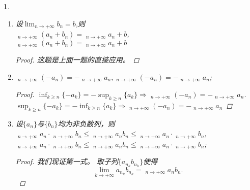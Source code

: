 \documentclass[utf8]{book}
\newtheorem{example}{}[section]             %
\DeclareMathOperator*\lowlim{\underline{lim}}
\DeclareMathOperator*\uplim{\overline{lim}}
\begin{document}
\begin{example}
\begin{enumerate}
\begin{proof}
取子列$\{a_{n_k} + b_{n_k}\}$,使得
$$\displaystyle\lim_{k\to +\infty}(a_{n_k} + b_{n_k}) =  \displaystyle\uplim_{n\to +\infty}(a_n + b_n).$$
取子列$\{b_{n_{k_l}}\}$使得
$$\displaystyle\lim_{l\to +\infty}b_{n_{k_l}} = \displaystyle\uplim_{k\to +\infty}b_{n_k} \leq \displaystyle\uplim_{n\to +\infty}b_n.$$
另一方面
$$\displaystyle\lim_{l\to +\infty}a_{n_{k_l}}\leq \displaystyle\uplim_{k\to +\infty}a_{n_k} \leq \displaystyle\uplim_{n\to +\infty}a_n.$$
所以
$$\displaystyle\uplim_{n\to +\infty}(a_n + b_n) \leq \displaystyle\uplim_{n\to +\infty}a_n + \displaystyle\uplim_{n\to +\infty}b_n.$$
\end{proof}
\item 设$\displaystyle\lim_{n\to +\infty}b_n = b$,则\\
$\displaystyle\lowlim_{n\to +\infty}(a_n + b_n) = \displaystyle\lowlim_{n\to +\infty}a_n + b$,\\
$\displaystyle\uplim_{n\to +\infty}(a_n + b_n) = \displaystyle\uplim_{n\to +\infty}a_n + b$
\begin{proof}
这题是上面一题的直接应用。
\end{proof}
\item $\displaystyle\lowlim_{n\to +\infty}(-a_n)=-\displaystyle\uplim_{n\to +\infty}a_n, \displaystyle\uplim_{n\to +\infty}(-a_n)=-\displaystyle\lowlim_{n\to +\infty}a_n$;
\begin{proof}$\displaystyle\inf_{k\geq n}\{-a_k\} = -\displaystyle \sup_{k \geq n}\{a_k\} \Rightarrow \displaystyle\lowlim_{n\to +\infty}(-a_n)=-\displaystyle\uplim_{n\to +\infty}a_n$.\\
$\displaystyle\sup_{k\geq n}\{-a_k\} = -\displaystyle \inf_{k \geq n}\{a_k\} \Rightarrow \displaystyle\uplim_{n\to +\infty}(-a_n)=-\displaystyle\lowlim_{n\to +\infty}a_n$
\end{proof}
\item 设$\{a_n\}$与$\{b_n\}$均为非负数列，则\\
$\displaystyle\lowlim_{n\to +\infty}a_n\cdot \displaystyle\lowlim_{n\to +\infty}b_n \leq \displaystyle\lowlim_{n\to +\infty}a_nb_n\leq \displaystyle\lowlim_{n\to +\infty}a_n\cdot\displaystyle\uplim_{n\to +\infty}b_n$,\\
$\displaystyle\lowlim_{n\to +\infty}a_n\cdot \displaystyle\uplim_{n\to +\infty}b_n \leq \displaystyle\uplim_{n\to +\infty}a_nb_n\leq \displaystyle\uplim_{n\to +\infty}a_n\cdot\displaystyle\uplim_{n\to +\infty}b_n$;
\begin{proof}
我们现证第一式。
取子列$\{a_{n_k}b_{n_k}\}$使得
$$\displaystyle\lim_{k\to +\infty}a_{n_k}b_{n_k}=\displaystyle\lowlim_{n\to +\infty}a_nb_n.$$

\end{proof}
\end{enumerate}
\end{example}
\end{document}
